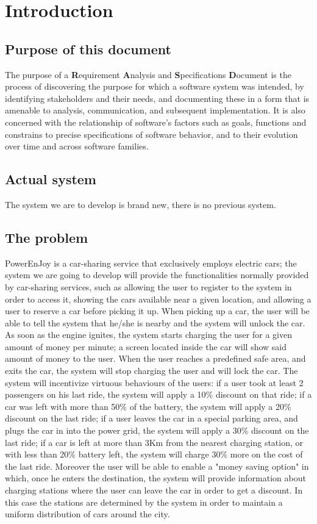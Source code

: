 \section{Introduction}
\subsection{Purpose of this document}
The purpose of a \textbf{R}equirement \textbf{A}nalysis and \textbf{S}pecifications \textbf{D}ocument is the process of discovering the purpose for which a software system was intended, by identifying stakeholders and their needs, and documenting these in a form that is amenable to analysis, communication, and subsequent implementation.  It is also concerned with the relationship of software's factors such as goals, functions and constrains to precise specifications of software behavior, and to their evolution over time and across software families.

	\subsection{Actual system}
The system we are to develop is brand new, there is no previous system.
\subsection{The problem}
PowerEnJoy is a car-sharing service that exclusively employs electric cars; the system we are going to develop will provide the functionalities normally provided by car-sharing services, such as allowing the user to register to the system in order to access it, showing the cars available near a given location, and allowing a user to reserve a car before picking it up. When picking up a car, the user will be able to tell the system that he/she is nearby and the system will unlock the car. As soon as the engine ignites, the system starts charging the user for a given amount of money per minute; a screen located inside the car will show said amount of money to the user. When the user reaches a predefined safe area, and exits the car, the system will stop charging the user and will lock the car. The system will incentivize virtuous behaviours of the users: if a user took at least 2 passengers on his last ride, the system will apply a 10\% discount on that ride; if a car was left with more than 50\% of the battery, the system will apply a 20\% discount on the last ride; if a user leaves the car in a special parking area, and plugs the car in into the power grid, the system will apply a 30\% discount on the last ride; if a car is left at more than 3Km from the nearest charging station, or with less than 20\% battery left, the system will charge 30\% more on the cost of the last ride. Moreover the user will be able to enable a "money saving option" in which, once he enters the destination, the system will provide information about charging stations where the user can leave the car in order to get a discount. In this case the stations are determined by the system in order to maintain a uniform distribution of cars around the city.
